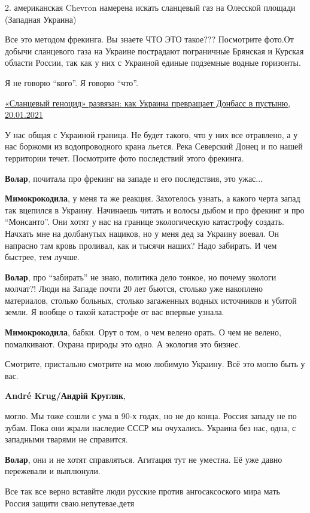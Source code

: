 \begin{itemize}
\begin{itemize}
2. американская Chevron намерена искать сланцевый газ на Олесской площади (Западная Украина)

Все это методом фрекинга. Вы знаете ЧТО ЭТО такое??? Посмотрите фото.От добычи
сланцевого газа на Украине пострадают пограничные Брянская и Курская области
России, так как у них с Украиной единые подземные водные горизонты.

Я не говорю \enquote{кого}. Я говорю \enquote{что}.

\href{https://sevastopol-su.turbopages.org/sevastopol.su/s/news/slancevyy-genocid-razvyazan-kak-ukraina-prevrashchaet-donbass-v-pustynyu}{«Сланцевый геноцид» развязан: как Украина превращает Донбасс в пустыню, 20.01.2021%
}

У нас общая с Украиной граница. Не будет такого, что у них все отравлено, а у
нас боржоми из водопроводного крана льется. Река Северский Донец и по нашей
территории течет. Посмотрите фото последствий этого фрекинга.

\textbf{Волар}, почитала про фрекинг на западе и его последствия, это ужас...

\textbf{Мимокрокодила}, у меня та же реакция. Захотелось узнать, а какого черта запад
так вцепился в Украину. Начинаешь читать и волосы дыбом и про фрекинг и про
\enquote{Монсанто}. Они хотят у нас на границе экологическую катастрофу создать.
Начхать мне на долбанутых нациков, но у меня дед за Украину воевал. Он напрасно
там кровь проливал, как и тысячи наших? Надо забирать. И чем быстрее, тем
лучше.

\textbf{Волар}, про \enquote{забирать} не знаю, политика дело тонкое, но почему экологи молчат?!
Люди на Западе почти 20 лет бьются, столько уже накоплено материалов, столько
больных, столько загаженных водных источников и убитой земли. Я вообще о такой
катастрофе от вас впервые узнала.

\textbf{Мимокрокодила}, бабки. Орут о том, о чем велено орать. О чем не велено,
помалкивают. Охрана природы это одно. А экология это бизнес.

\end{itemize} %


Смотрите, пристально смотрите на мою любимую Украину. Всё это могло быть у вас.

\begin{itemize} %
\textbf{André Krug/Андрій Кругляк}, 

могло. Мы тоже сошли с ума в 90-х годах, но не до конца. Россия западу не по
зубам. Пока они жрали наследие СССР мы очухались. Украина без нас, одна, с
западными тварями не справится.

\textbf{Волар}, они и не хотят справляться. Агитация тут не уместна. Её уже давно пережевали и выплюнули.
\end{itemize} %


Все так все верно вставйте люди русские против ангосаксоского мира мать Россия
защити сваю.непутевае.детя

\end{itemize} %
